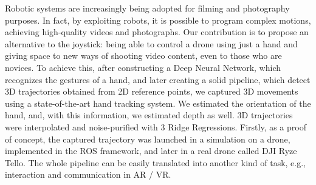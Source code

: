 Robotic systems are increasingly being adopted for filming and photography purposes. In fact, by exploiting robots, it is possible to program complex motions, achieving high-quality videos and photographs. Our contribution is to propose an alternative to the joystick: being able to control a drone using just a hand and giving space to new ways of shooting video content, even to those who are novices. To achieve this, after constructing a Deep Neural Network, which recognizes the gestures of a hand, and later creating a solid pipeline, which detect 3D trajectories obtained from 2D reference points, we captured 3D movements using a state-of-the-art hand tracking system. We estimated the orientation of the hand, and, with this information, we estimated depth as well. 3D trajectories were interpolated and noise-purified with 3 Ridge Regressions. Firstly, as a proof of concept, the captured trajectory was launched in a simulation on a drone, implemented in the ROS framework, and later in a real drone called DJI Ryze Tello. The whole pipeline can be easily translated into another kind of task, e.g., interaction and communication in AR / VR.